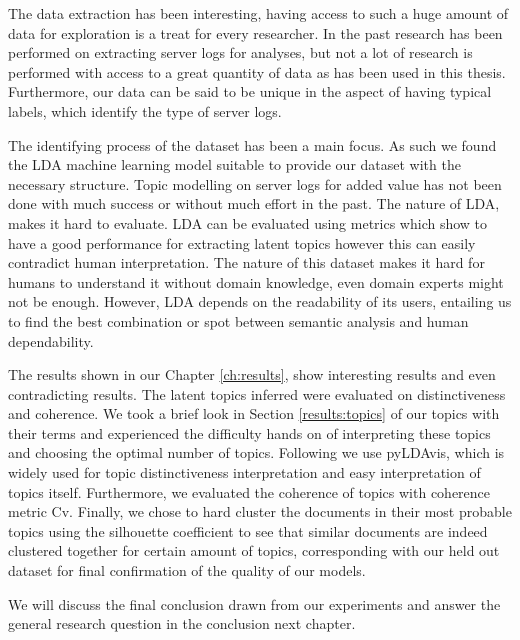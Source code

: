 The data extraction has been interesting, having access to such a huge amount of data for exploration is a treat for every researcher. In the past research has been performed on extracting server logs for analyses, but not a lot of research is performed with access to a great quantity of data as has been used in this thesis. Furthermore, our data can be said to be unique in the aspect of having typical labels, which identify the type of server logs. 

The identifying process of the dataset has been a main focus. As such we found the LDA machine learning model suitable to provide our dataset with the necessary structure. Topic modelling on server logs for added value has not been done with much success or without much effort in the past. The nature of LDA, makes it hard to evaluate. LDA can be evaluated using metrics which show to have a good performance for extracting latent topics however this can easily contradict human interpretation. The nature of this dataset makes it hard for humans to understand it without domain knowledge, even domain experts might not be enough. However, LDA depends on the readability of its users, entailing us to find the best combination or spot between semantic analysis and human dependability.

The results shown in our Chapter \ref{ch:results}, show interesting results and even contradicting results. The latent topics inferred were evaluated on distinctiveness and coherence. We took a brief look in Section \ref{results:topics} of our topics with their terms and experienced the difficulty hands on of interpreting these topics and choosing the optimal number of topics. Following we use pyLDAvis, which is widely used for topic distinctiveness interpretation and easy interpretation of topics itself. Furthermore, we evaluated the coherence of topics with coherence metric Cv. Finally, we chose to hard cluster the documents in their most probable topics using the silhouette coefficient to see that similar documents are indeed clustered together for certain amount of topics, corresponding with our held out dataset for final confirmation of the quality of our models.

We will discuss the final conclusion drawn from our experiments and answer the general research question in the conclusion next chapter.

